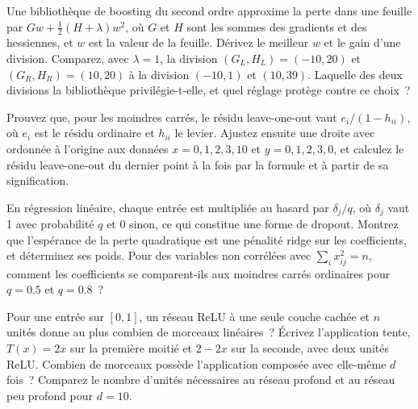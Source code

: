 \begin{question}\label{iq:iv1:machine-learning:37}
Une bibliothèque de boosting du second ordre approxime la perte dans une feuille par $Gw + \frac12(H + \lambda)w^2$, où $G$ et $H$ sont les sommes des gradients et des hessiennes, et $w$ est la valeur de la feuille. Dérivez le meilleur $w$ et le gain d'une division. Comparez, avec $\lambda = 1$, la division $(G_L, H_L) = (-10, 20)$ et $(G_R, H_R) = (10, 20)$ à la division $(-10, 1)$ et $(10, 39)$. Laquelle des deux divisions la bibliothèque privilégie-t-elle, et quel réglage protège contre ce choix~?
\end{question}

\begin{question}\label{iq:iv1:machine-learning:38}
Prouvez que, pour les moindres carrés, le résidu leave-one-out vaut $e_i/(1 - h_{ii})$, où $e_i$ est le résidu ordinaire et $h_{ii}$ le levier. Ajustez ensuite une droite avec ordonnée à l'origine aux données $x = 0, 1, 2, 3, 10$ et $y = 0, 1, 2, 3, 0$, et calculez le résidu leave-one-out du dernier point à la fois par la formule et à partir de sa signification.
\end{question}

\begin{question}\label{iq:iv1:machine-learning:39}
En régression linéaire, chaque entrée est multipliée au hasard par $\delta_j/q$, où $\delta_j$ vaut 1 avec probabilité $q$ et 0 sinon, ce qui constitue une forme de dropout. Montrez que l'espérance de la perte quadratique est une pénalité ridge sur les coefficients, et déterminez ses poids. Pour des variables non corrélées avec $\sum_i x_{ij}^2 = n$, comment les coefficients se comparent-ils aux moindres carrés ordinaires pour $q = 0.5$ et $q = 0.8$~?
\end{question}

\begin{question}\label{iq:iv1:machine-learning:40}
Pour une entrée sur $[0, 1]$, un réseau ReLU à une seule couche cachée et $n$ unités donne au plus combien de morceaux linéaires~? Écrivez l'application tente, $T(x) = 2x$ sur la première moitié et $2 - 2x$ sur la seconde, avec deux unités ReLU. Combien de morceaux possède l'application composée avec elle-même $d$ fois~? Comparez le nombre d'unités nécessaires au réseau profond et au réseau peu profond pour $d = 10$.
\end{question}

